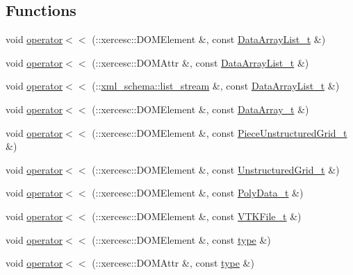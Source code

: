 \subsection*{Functions}
\begin{DoxyCompactItemize}
\item 
void \hyperlink{vtk-unstructured_8h_a2721bf53923d5c5970c933ae5921f4dc}{operator$<$$<$} (\-::xercesc\-::\-D\-O\-M\-Element \&, const \hyperlink{classDataArrayList__t}{Data\-Array\-List\-\_\-t} \&)
\item 
void \hyperlink{vtk-unstructured_8h_a24556fd48a78f322cb82d7bcdc9c4ab9}{operator$<$$<$} (\-::xercesc\-::\-D\-O\-M\-Attr \&, const \hyperlink{classDataArrayList__t}{Data\-Array\-List\-\_\-t} \&)
\item 
void \hyperlink{vtk-unstructured_8h_a50f994a7e4e7766ad192e07d443a14e5}{operator$<$$<$} (\-::\hyperlink{namespacexml__schema_ab6c818ac91e70a25620375e0d000be83}{xml\-\_\-schema\-::list\-\_\-stream} \&, const \hyperlink{classDataArrayList__t}{Data\-Array\-List\-\_\-t} \&)
\item 
void \hyperlink{vtk-unstructured_8h_a1ef510bc9917a229ea37ca7045a47099}{operator$<$$<$} (\-::xercesc\-::\-D\-O\-M\-Element \&, const \hyperlink{classDataArray__t}{Data\-Array\-\_\-t} \&)
\item 
void \hyperlink{vtk-unstructured_8h_a126131a4ada1026f6eb13998253e4800}{operator$<$$<$} (\-::xercesc\-::\-D\-O\-M\-Element \&, const \hyperlink{classPieceUnstructuredGrid__t}{Piece\-Unstructured\-Grid\-\_\-t} \&)
\item 
void \hyperlink{vtk-unstructured_8h_a4f19051c77ec836cb7beb9b68906631c}{operator$<$$<$} (\-::xercesc\-::\-D\-O\-M\-Element \&, const \hyperlink{classUnstructuredGrid__t}{Unstructured\-Grid\-\_\-t} \&)
\item 
void \hyperlink{vtk-unstructured_8h_a3c9c02d91057a8a29257177e90534c59}{operator$<$$<$} (\-::xercesc\-::\-D\-O\-M\-Element \&, const \hyperlink{classPolyData__t}{Poly\-Data\-\_\-t} \&)
\item 
void \hyperlink{vtk-unstructured_8h_a845f3985ea7fa7ecc6e7c7d77d1f8050}{operator$<$$<$} (\-::xercesc\-::\-D\-O\-M\-Element \&, const \hyperlink{classVTKFile__t}{V\-T\-K\-File\-\_\-t} \&)
\item 
void \hyperlink{vtk-unstructured_8h_af854f7b8e374accb10ab81c733522d94}{operator$<$$<$} (\-::xercesc\-::\-D\-O\-M\-Element \&, const \hyperlink{classtype}{type} \&)
\item 
void \hyperlink{vtk-unstructured_8h_a2be5209924ae2f707167fe61b493efe7}{operator$<$$<$} (\-::xercesc\-::\-D\-O\-M\-Attr \&, const \hyperlink{classtype}{type} \&)

\end{DoxyCompactItemize}
